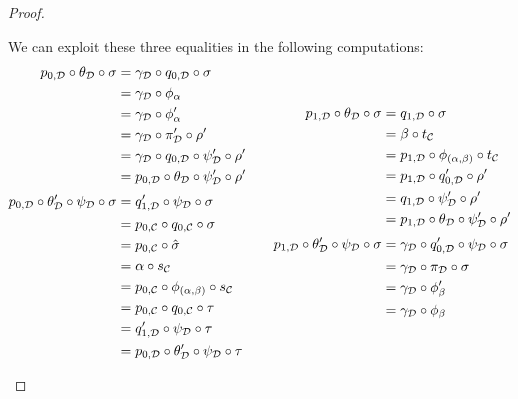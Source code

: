 \documentclass[a4paper,UKenglish,cleveref,pdftex,thm-restate,numberwithinsect]{lipics-v2021}
\begin{document}
\begin{proof}
\begin{enumerate}
We can exploit these three equalities in the following computations:
\[\begin{split} p_{0, \mathcal{D}}\circ \theta_{\mathcal{D}}\circ \sigma &=\gamma_{\mathcal{D}}\circ q_{0, \mathcal{D}}\circ \sigma\\&=  \gamma_{\mathcal{D}}\circ \phi_\alpha
	\\&= \gamma_{\mathcal{D}}\circ \phi'_\alpha 
	\\&= \gamma_{\mathcal{D}}\circ \pi'_{\mathcal{D}}\circ \rho'
	\\&=\gamma_{\mathcal{D}}\circ q_{0, \mathcal{D}}\circ\psi'_{\mathcal{D}} \circ \rho' 
	\\&= p_{0, \mathcal{D}}\circ \theta_{\mathcal{D}}\circ \psi'_{\mathcal{D}}\circ \rho'\\[.2\baselineskip]
	p_{0, \mathcal{D}}\circ \theta'_{\mathcal{D}}\circ \psi_{\mathcal{D}} \circ \sigma &=q'_{1, \mathcal{D}}\circ \psi_{\mathcal{D}}\circ \sigma\\&= p_{0, \mathcal{C}}\circ q_{0, \mathcal{C}}\circ \sigma \\&= p_{0, \mathcal{C}}\circ \hat{\sigma}\\&=  \alpha \circ s_{\mathcal{C}}
	\\&= p_{0, \mathcal{C}}\circ \phi_{(\alpha, \beta)}\circ s_{\mathcal{C}}
	\\&= p_{0, \mathcal{C}}\circ q_{0, \mathcal{C}}\circ \tau
	\\&=q'_{1, \mathcal{D}}\circ \psi_{\mathcal{D}}\circ\tau 
	\\&= p_{0, \mathcal{D}}\circ \theta'_{\mathcal{D}}\circ \psi_{\mathcal{D}}\circ \tau 
\end{split} \qquad \begin{split}
	p_{1, \mathcal{D}}\circ \theta_{\mathcal{D}} \circ \sigma &=q_{1, \mathcal{D}}\circ  \sigma\\&=\beta\circ t_{\mathcal{C}}\\&=  p_{1, \mathcal{D}}\circ \phi_{(\alpha, \beta)}\circ t_{\mathcal{C}}
	\\&= p_{1, \mathcal{D}}\circ q'_{0, \mathcal{D}}\circ \rho'
	\\&=  q_{1, \mathcal{D}}\circ \psi'_{\mathcal{D}}\circ \rho'
	\\&= p_{1, \mathcal{D}}\circ \theta_{\mathcal{D}}\circ \psi'_{\mathcal{D}}\circ \rho' \\[.2\baselineskip]  	p_{1, \mathcal{D}}\circ \theta'_{\mathcal{D}}\circ \psi_{\mathcal{D}} \circ \sigma &=\gamma_{\mathcal{D}}\circ q'_{0, \mathcal{D}}\circ \psi_{\mathcal{D}}\circ \sigma\\&=\gamma_{\mathcal{D}}\circ \pi_{\mathcal{D}}\circ \sigma\\&= \gamma_{\mathcal{D}}\circ \phi'_{\beta}\\&=  \gamma_{\mathcal{D}}\circ \phi_{\beta}

\end{split}\]
\end{enumerate}
\end{proof}
\end{document}
